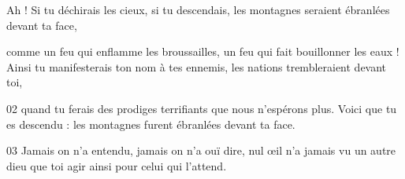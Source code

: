 Ah ! Si tu déchirais les cieux, si tu descendais, les montagnes seraient ébranlées devant ta face,

comme un feu qui enflamme les broussailles, un feu qui fait bouillonner les eaux ! Ainsi tu manifesterais ton nom à tes ennemis, les nations trembleraient devant toi,

02 quand tu ferais des prodiges terrifiants que nous n’espérons plus. Voici que tu es descendu : les montagnes furent ébranlées devant ta face.

03 Jamais on n’a entendu, jamais on n’a ouï dire, nul œil n’a jamais vu un autre dieu que toi agir ainsi pour celui qui l’attend.
